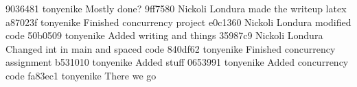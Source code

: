 9036481 tonyenike Mostly done?
9ff7580 Nickoli Londura made the writeup latex
a87023f tonyenike Finished concurrency project
e0c1360 Nickoli Londura modified code
50b0509 tonyenike Added writing and things
35987c9 Nickoli Londura Changed int in main and spaced code
840df62 tonyenike Finished concurrency assignment
b531010 tonyenike Added stuff
0653991 tonyenike Added concurrency code
fa83ec1 tonyenike There we go

